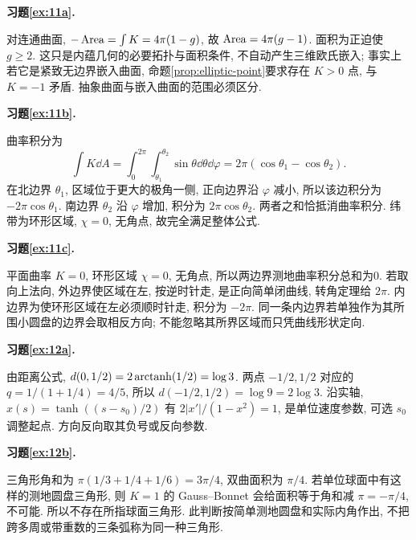 \par{}
\par{}
\noindent\textbf{习题\ref{ex:11a}.}
\begin{solution}
对连通曲面, $-\operatorname{Area}=\int K=4\pi(1-g)$, 故 $\operatorname{Area}=4\pi(g-1)$. 面积为正迫使 $g\ge2$. 这只是内蕴几何的必要拓扑与面积条件, 不自动产生三维欧氏嵌入; 事实上若它是紧致无边界嵌入曲面, 命题\ref{prop:elliptic-point}要求存在 $K>0$ 点, 与 $K=-1$ 矛盾. 抽象曲面与嵌入曲面的范围必须区分.
\end{solution}
\par{}
\noindent\textbf{习题\ref{ex:11b}.}
\begin{solution}
曲率积分为
\[
 \int K\dd A=\int_0^{2\pi}\int_{\theta_1}^{\theta_2}\sin\theta\dd\theta\dd\varphi
 =2\pi(\cos\theta_1-\cos\theta_2).
\]
在北边界 $\theta_1$, 区域位于更大的极角一侧, 正向边界沿 $\varphi$ 减小, 所以该边积分为 $-2\pi\cos\theta_1$. 南边界 $\theta_2$ 沿 $\varphi$ 增加, 积分为 $2\pi\cos\theta_2$. 两者之和恰抵消曲率积分. 纬带为环形区域, $\chi=0$, 无角点, 故完全满足整体公式.
\end{solution}
\par{}
\noindent\textbf{习题\ref{ex:11c}.}
\begin{solution}
平面曲率 $K=0$, 环形区域 $\chi=0$, 无角点, 所以两边界测地曲率积分总和为0. 若取向上法向, 外边界使区域在左, 按逆时针走, 是正向简单闭曲线, 转角定理给 $2\pi$. 内边界为使环形区域在左必须顺时针走, 积分为 $-2\pi$. 同一条内边界若单独作为其所围小圆盘的边界会取相反方向; 不能忽略其所界区域而只凭曲线形状定向.
\end{solution}
\par{}
\par{}
\noindent\textbf{习题\ref{ex:12a}.}
\begin{solution}
由距离公式, $d(0,1/2)=2\operatorname{arctanh}(1/2)=\log3$. 两点 $-1/2,1/2$ 对应的 $q=1/(1+1/4)=4/5$, 所以 $d(-1/2,1/2)=\log9=2\log3$. 沿实轴, $x(s)=\tanh((s-s_0)/2)$ 有 $2|x'|/(1-x^2)=1$, 是单位速度参数, 可选 $s_0$ 调整起点. 方向反向取其负号或反向参数.
\end{solution}
\par{}
\noindent\textbf{习题\ref{ex:12b}.}
\begin{solution}
三角形角和为 $\pi(1/3+1/4+1/6)=3\pi/4$, 双曲面积为 $\pi/4$. 若单位球面中有这样的测地圆盘三角形, 则 $K=1$ 的 Gauss--Bonnet 会给面积等于角和减 $\pi=-\pi/4$, 不可能. 所以不存在所指球面三角形. 此判断按简单测地圆盘和实际内角作出, 不把跨多周或带重数的三条弧称为同一种三角形.
\end{solution}
